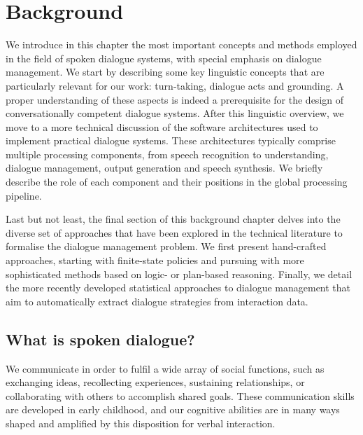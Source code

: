 
\chapter{Background}
\label{chap:background}

We introduce in this chapter the most important concepts and methods employed in the field of spoken dialogue systems, with special emphasis on dialogue management.  We start by describing some key linguistic concepts that are particularly relevant for our work: turn-taking, dialogue acts and grounding.  A proper understanding of these aspects is indeed a prerequisite for the design of conversationally competent dialogue systems. After this linguistic overview, we move to a more technical discussion of the software architectures used to implement practical dialogue systems.  These architectures typically comprise multiple processing components, from speech recognition to understanding, dialogue management, output generation and speech synthesis.  We briefly describe the role of each component and their positions in the global processing pipeline. 

Last but not least, the final section of this background chapter delves into the diverse set of approaches that have been explored in the technical literature to formalise the dialogue management problem.  We first present hand-crafted approaches, starting with finite-state policies and pursuing with more sophisticated methods based on logic- or plan-based reasoning.  Finally, we detail the more recently developed statistical approaches to dialogue management that aim to automatically extract dialogue strategies from interaction data.

\section{What is spoken dialogue?}

We communicate in order to fulfil a wide array of social functions, such as exchanging ideas, recollecting experiences,  sustaining relationships, or collaborating with others to accomplish shared goals. These communication skills are developed in early childhood, and our cognitive abilities are in many ways shaped and amplified by this disposition for verbal interaction.  

